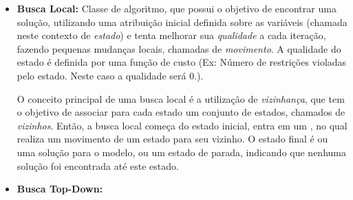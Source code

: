 \begin{itemize}
  \item{\textbf{Busca Local:} Classe de algoritmo, que possui o
  objetivo de encontrar uma solução, utilizando uma atribuição inicial
  definida sobre as variáveis (chamada neste contexto
  de \textit{estado}) e tenta melhorar sua \textit{qualidade} a cada
  iteração, fazendo pequenas mudanças locais, chamadas
  de \textit{movimento}. A qualidade do estado é definida por uma
  função de custo (Ex: Número de restrições violadas pelo
  estado. Neste caso a qualidade será 0.).

  O conceito principal de uma busca local é a utilização
  de \textit{vizinhança}, que tem o objetivo de associar para cada
  estado um conjunto de estados, chamados de \textit{vizinhos}. Então,
  a busca local começa do estado inicial, entra em um , no
  qual realiza um movimento de um estado para seu vizinho. O estado
  final é ou uma solução para o modelo, ou um estado de parada,
  indicando que nenhuma solução foi encontrada até este estado.}

  \item{\textbf{Busca Top-Down:}


  }

\end{itemize}
